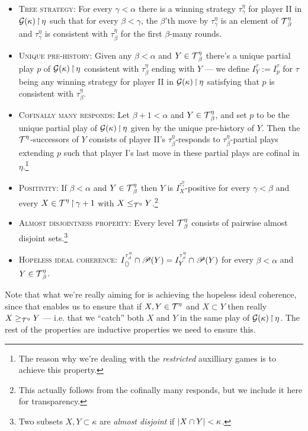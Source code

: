 \documentclass[../../main]{subfiles}
\begin{document}
{	\begin{itemize}
		\item \textsc{Tree strategy}: For every $\gamma<\alpha$ there is a winning strategy $\tau^\eta_\gamma$ for player II in $\operatorname{\mathcal G}(\kappa)\operatorname{\upharpoonright}\eta$ such that for every $\beta<\gamma$, the $\beta$'th move by $\tau^\eta_\gamma$ is an element of $\operatorname{\mathcal T}^\eta_\beta$ and $\tau^\eta_\gamma$ is consistent with $\tau^\eta_\beta$ for the first $\beta$-many rounds.
		\item \textsc{Unique pre-history}: Given any $\beta<\alpha$ and $Y\in\operatorname{\mathcal T}^\eta_\beta$ there's a unique partial play $p$ of $\operatorname{\mathcal G}(\kappa)\operatorname{\upharpoonright}\eta$ consistent with $\tau^\eta_\beta$ ending with $Y$ --- we define $I_Y^\tau:=I_p^\tau$ for $\tau$ being any winning strategy for player II in $\operatorname{\mathcal G}(\kappa)\operatorname{\upharpoonright}\eta$ satisfying that $p$ is consistent with $\tau^\eta_\beta$.
		\item \textsc{Cofinally many responds}: Let $\beta+1<\alpha$ and $Y\in\operatorname{\mathcal T}^\eta_\beta$, and set $p$ to be the unique partial play of $\operatorname{\mathcal G}(\kappa)\operatorname{\upharpoonright}\eta$ given by the unique pre-history of $Y$. Then the $\operatorname{\mathcal T}^\eta$-successors of $Y$ consists of player II's $\tau^\eta_\beta$-responds to $\tau^\eta_\beta$-partial plays extending $p$ such that player I's last move in these partial plays are cofinal in $\eta$.\footnote{The reason why we're dealing with the \textit{restricted} auxilliary games is to achieve this property.}
		\item \textsc{Positivity}: If $\beta<\alpha$ and $Y\in\operatorname{\mathcal T}^\eta_\beta$ then $Y$ is $I_X^{\tau^\eta_\gamma}$-positive for every $\gamma<\beta$ and every $X\in\operatorname{\mathcal T}^\eta\operatorname{\upharpoonright}\gamma+1$ with $X\leq_{\operatorname{\mathcal T}^\eta}Y$.\footnote{This actually follows from the cofinally many responds, but we include it here for transparency.}
	\item \textsc{Almost disjointness property}: Every level $\operatorname{\mathcal T}^\eta_\beta$ consists of pairwise almost disjoint sets.\footnote{Two subsets $X,Y\subset\kappa$ are \textit{almost disjoint} if $\left|X\cap Y\right|<\kappa$.}
		\item \textsc{Hopeless ideal coherence}: $I_{\langle \rangle}^{\tau^\eta_\beta}\cap\mathscr P(Y)=I_Y^{\tau^\eta_\beta}\cap\mathscr P(Y)$ for every $\beta<\alpha$ and $Y\in\operatorname{\mathcal T}^\eta_\beta$.\\
	\end{itemize}

	Note that what we're really aiming for is achieving the hopeless ideal coherence, since that enables us to ensure that if $X,Y\in\operatorname{\mathcal T}^\eta$ and $X\subset Y$ then really $X\geq_{\operatorname{\mathcal T}^\eta}Y$ --- i.e. that we ``catch'' both $X$ and $Y$ in the same play of $\operatorname{\mathcal G}(\kappa)\operatorname{\upharpoonright}\eta$. The rest of the properties are inductive properties we need to ensure this.

}
\end{document}
